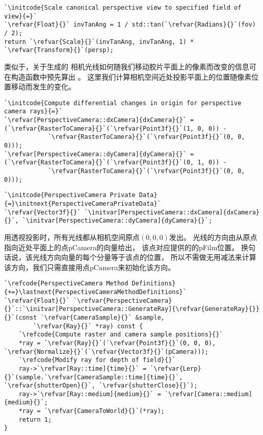 \begin{lstlisting}
`\initcode{Scale canonical perspective view to specified field of view}{=}`
`\refvar{Float}{}` invTanAng = 1 / std::tan(`\refvar{Radians}{}`(fov) / 2);
return `\refvar{Scale}{}`(invTanAng, invTanAng, 1) * `\refvar{Transform}{}`(persp);
\end{lstlisting}

类似于，关于生成的
相机光线如何随我们移动胶片平面上的像素而改变的信息可在构造函数中预先算出
。
这里我们计算相机空间近处投影平面上的位置随像素位置移动而发生的变化。
\begin{lstlisting}
`\initcode{Compute differential changes in origin for perspective camera rays}{=}`
`\refvar[PerspectiveCamera::dxCamera]{dxCamera}{}` = (`\refvar{RasterToCamera}{}`(`\refvar{Point3f}{}`(1, 0, 0)) -
            `\refvar{RasterToCamera}{}`(`\refvar{Point3f}{}`(0, 0, 0)));
`\refvar[PerspectiveCamera::dyCamera]{dyCamera}{}` = (`\refvar{RasterToCamera}{}`(`\refvar{Point3f}{}`(0, 1, 0)) -
            `\refvar{RasterToCamera}{}`(`\refvar{Point3f}{}`(0, 0, 0)));
\end{lstlisting}
\begin{lstlisting}
`\initcode{PerspectiveCamera Private Data}{=}\initnext{PerspectiveCameraPrivateData}`
`\refvar{Vector3f}{}` `\initvar[PerspectiveCamera::dxCamera]{dxCamera}{}`, `\initvar[PerspectiveCamera::dyCamera]{dyCamera}{}`;
\end{lstlisting}

用透视投影时，所有光线都从相机空间原点$(0,0,0)$发出。
光线的方向由从原点指向近处平面上的点{\ttfamily pCamera}的向量给出，
该点对应提供的的{\ttfamily pFilm}位置。
换句话说，该光线方向向量的每个分量等于该点的位置，
所以不需做无用减法来计算该方向，我们只需直接用点{\ttfamily pCamera}来初始化该方向。
\begin{lstlisting}
`\refcode{PerspectiveCamera Method Definitions}{+=}\lastnext{PerspectiveCameraMethodDefinitions}`
`\refvar{Float}{}` `\refvar{PerspectiveCamera}{}`::`\initvar[PerspectiveCamera::GenerateRay]{\refvar{GenerateRay}{}}{}`(const `\refvar{CameraSample}{}` &sample,
        `\refvar{Ray}{}` *ray) const {
    `\refcode{Compute raster and camera sample positions}{}`
    *ray = `\refvar{Ray}{}`(`\refvar{Point3f}{}`(0, 0, 0), `\refvar{Normalize}{}`(`\refvar{Vector3f}{}`(pCamera)));
    `\refcode{Modify ray for depth of field}{}`
    ray->`\refvar[Ray::time]{time}{}` = `\refvar{Lerp}{}`(sample.`\refvar[CameraSample::time]{time}{}`, `\refvar{shutterOpen}{}`, `\refvar{shutterClose}{}`);
    ray->`\refvar[Ray::medium]{medium}{}` = `\refvar[Camera::medium]{medium}{}`;
    *ray = `\refvar{CameraToWorld}{}`(*ray);
    return 1;
}
\end{lstlisting}

